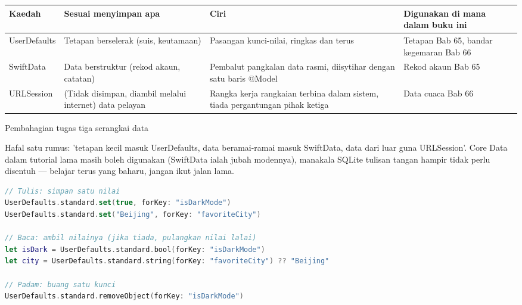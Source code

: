 


\begin{center}
\begin{tabularx}{\linewidth}{|X|X|X|X|}
\hline
\textbf{Kaedah} & \textbf{Sesuai menyimpan apa} & \textbf{Ciri} & \textbf{Digunakan di mana dalam buku ini} \tabularnewline
\hline
UserDefaults & Tetapan berselerak (suis, keutamaan) & Pasangan kunci-nilai, ringkas dan terus & Tetapan Bab 65, bandar kegemaran Bab 66 \tabularnewline
SwiftData & Data berstruktur (rekod akaun, catatan) & Pembalut pangkalan data rasmi, diisytihar dengan satu baris @Model & Rekod akaun Bab 65 \tabularnewline
URLSession & (Tidak disimpan, diambil melalui internet) data pelayan & Rangka kerja rangkaian terbina dalam sistem, tiada pergantungan pihak ketiga & Data cuaca Bab 66 \tabularnewline
\hline
\end{tabularx}
\end{center}

\begin{center}\small\color{gray}Pembahagian tugas tiga serangkai data\end{center}

Hafal satu rumus: 'tetapan kecil masuk UserDefaults, data beramai-ramai masuk SwiftData, data dari luar guna URLSession'. Core Data dalam tutorial lama masih boleh digunakan (SwiftData ialah jubah modennya), manakala SQLite tulisan tangan hampir tidak perlu disentuh — belajar terus yang baharu, jangan ikut jalan lama.


\begin{lstlisting}[language=Swift]
// Tulis: simpan satu nilai
UserDefaults.standard.set(true, forKey: "isDarkMode")
UserDefaults.standard.set("Beijing", forKey: "favoriteCity")

// Baca: ambil nilainya (jika tiada, pulangkan nilai lalai)
let isDark = UserDefaults.standard.bool(forKey: "isDarkMode")
let city = UserDefaults.standard.string(forKey: "favoriteCity") ?? "Beijing"

// Padam: buang satu kunci
UserDefaults.standard.removeObject(forKey: "isDarkMode")
\end{lstlisting}

